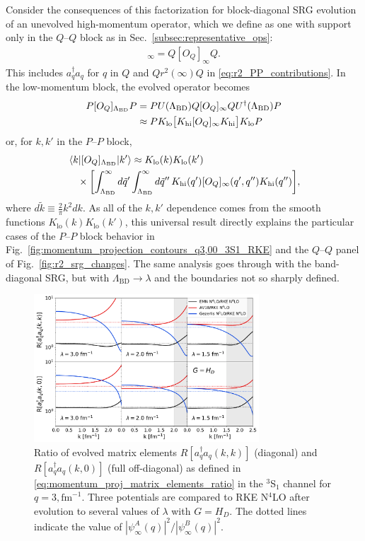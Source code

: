 \documentclass[10pt,aps,prc,floatfix,twocolumn,nofootinbib]{revtex4-1}
\newcommand{\LambdaBD}{{\Lambda_{\text{BD}}}}
\newcommand{\ataq}{a^{\dagger}_q a_q}
\newcommand{\Klo}{K_{\text{lo}}}
\newcommand{\Khi}{K_{\text{hi}}}
\newcommand{\PP}{\ensuremath{P\mbox{--}P}}
\newcommand{\QQ}{\ensuremath{Q\mbox{--}Q}}
\begin{document}
Consider the consequences of this factorization for block-diagonal SRG evolution of an unevolved high-momentum operator, which we define as one with support only in the $\QQ$ block as in Sec.~\ref{subsec:representative_ops}:
%
\begin{align}
    [O_Q]_\infty = Q [O_Q]_\infty Q.
\end{align}
%
This includes $\ataq$ for $q$ in $Q$ and $Qr^2(\infty)Q$ in \eqref{eq:r2_PP_contributions}.
In the low-momentum block, the evolved operator becomes
%
\begin{align}
    P [O_Q]_\LambdaBD P &=
      P U(\LambdaBD)Q[O_Q]_\infty Q U^\dagger(\LambdaBD) P \notag \\
      &\approx P \Klo \bigl[\Khi [O_Q]_\infty \Khi\bigr] \Klo P
\end{align}
%
or, for $k,k'$ in the $\PP$ block,
%
\begin{align} \label{eq:factored_op}
   & \mel{k}{[O_Q]_\LambdaBD}{k'} \approx 
        \Klo(k) \Klo(k') \notag \\
  &  \quad \times
     \biggl[
      \int_{\LambdaBD}^{\infty} d\tilde{q}' 
      \int_{\LambdaBD}^{\infty} d\tilde{q}''\, \Khi(q') [O_Q]_\infty(q',q'') \Khi(q'')
     \biggr],
\end{align}
%
where $d\tilde{k} \equiv \frac{2}{\pi} k^2 dk$.
As all of the $k,k'$ dependence comes from the smooth functions $\Klo(k)\Klo(k')$, this universal result directly explains the particular cases of the $\PP$ block behavior in Fig.~\ref{fig:momentum_projection_contours_q3,00_3S1_RKE} and the $\QQ$ panel of Fig.~\ref{fig:r2_srg_changes}. 
The same analysis goes through with the band-diagonal SRG, but with $\LambdaBD \rightarrow \lambda$ and the boundaries not so sharply defined.

%
\begin{figure}[tbh]
	\includegraphics[clip,width=0.75\textwidth]{momentum_projection_ratios_q3,00_3S1_Wegner_kvnns_111_79_6_222.pdf}%
	\caption{Ratio of evolved matrix elements $R[\ataq(k,k)]$ (diagonal) and $R[\ataq(k,0)]$ (full off-diagonal) as defined in \eqref{eq:momentum_proj_matrix_elements_ratio} in the $^3$S$_1$ channel for $q = 3,\mbox{fm}^{-1}$.
	Three potentials are compared to RKE N$^4$LO after evolution to several values of $\lambda$ with $G = H_D$.
	The dotted lines indicate the value of $|\psi^A_{\infty}(q)|^2 / |\psi^B_{\infty}(q)|^2$.}
	\label{fig:R_ratio_comparison}
\end{figure}
%
\end{document}
